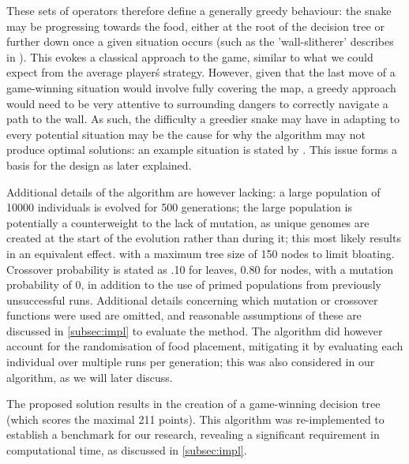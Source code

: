 \documentclass[british,10pt,a4paper]{article}
\begin{document}
These sets of operators therefore define a generally greedy behaviour: the snake may be progressing towards the food, either at the root of the decision tree or further down once a given situation occurs (such as the 'wall-slitherer' describes in \cite{Ehlis2000-sz}). This evokes a classical approach to the game, similar to what we could expect from the average player\'s strategy. However, given that the last move of a game-winning situation would involve fully covering the map, a greedy approach would need to be very attentive to surrounding dangers to correctly navigate a path to the wall. As such, the difficulty a greedier snake may have in adapting to every potential situation may be the cause for why the algorithm may not produce optimal solutions: an example situation is stated by \citeauthor{Ehlis2000-sz}. This issue forms a basis for the design as later explained. \newline

Additional details of the algorithm are however lacking: a large population of 10000 individuals is evolved for 500 generations; the large population is potentially a counterweight to the lack of mutation, as unique genomes are created at the start of the evolution rather than during it; this most likely results in an equivalent effect. with a maximum tree size of 150 nodes to limit bloating. Crossover probability is stated as .10 for leaves, 0.80 for nodes, with a mutation probability of 0, in addition to the use of primed populations from previously unsuccessful runs. Additional details concerning which mutation or crossover functions were used are omitted, and reasonable assumptions of these are discussed in \autoref{subsec:impl} to evaluate the method. The algorithm did however account for the randomisation of food placement, mitigating it by evaluating each individual over multiple runs per generation; this was also considered in our algorithm, as we will later discuss.\newline

The proposed solution results in the creation of a game-winning decision tree (which scores the maximal 211 points). This algorithm was re-implemented to establish a benchmark for our research, revealing a significant requirement in computational time, as discussed in \autoref{subsec:impl}.
\end{document}
